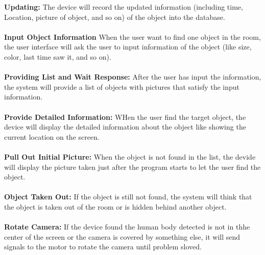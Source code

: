 \documentclass[12pt]{article}
\begin{document}
\textbf{Updating:} The device will record the updated information (including time, Location, picture of object, and so on) of the object into the database.\\\\
\textbf{Input Object Information} When the user want to find one object in the room, the user interface will ask the user to input information of the object (like size, color, last time saw it, and so on).\\\\
\textbf{Providing List and Wait Response:} After the user has input the information, the system will provide a list of objects with pictures that satisfy the input information.\\\\
\textbf{Provide Detailed Information:} WHen the user find the target object, the device will display the detailed information about the object like showing the current location on the screen. \\\\
\textbf{Pull Out Initial Picture:} When the object is not found in the list, the devide will display the picture taken just after the program starts to let the user find the object.\\\\
\textbf{Object Taken Out:} If the object is still not found, the system will think that the object is taken out of the room or is hidden behind another object. \\\\
\textbf{Rotate Camera:} If the device found the human body detected is not in thhe center of the screen or the camera is covered by something else, it will send signals to the motor to rotate the camera until problem sloved. 
\end{document}
